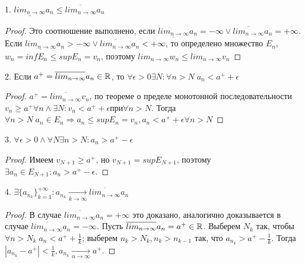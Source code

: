 \documentclass[main]{subfiles}
\begin{document}
\begin{theorem}\label{updown1}
    1. $\underline{lim_{n\to\infty}}a_n \leq \overline{lim_{n\to\infty}}a_n$
\end{theorem}
\begin{proof}
    Это соотношение выполнено, если $\underline{lim_{n\to\infty}}a_n = 
    -\infty \vee \overline{lim_{n\to\infty}}a_n = +\infty$. Если 
    $\underline{lim_{n\to\infty}}a_n > -\infty \vee 
    \overline{lim_{n\to\infty}}a_n < +\infty$, то определено множество 
    $E_n$, $w_n = infE_n \leq supE_n = v_n$,
    поэтому $lim_{n\to\infty}w_n \leq lim_{n\to\infty}v_n$
\end{proof}

\begin{theorem}\label{updown2}
    2. Если $a^+ = \overline{lim_{n\to\infty}}a_n \in \mathbb{R}$, то $\forall \epsilon > 0
    \exists N : \forall n > N \; a_n < a^+ + \epsilon$
\end{theorem}
\begin{proof}
    $a^+ = \overline{lim_{n\to\infty}}v_n$, по теореме о пределе монотонной 
    последовательности $v_n \geq a^+ \forall n \wedge \exists N : v_n <
    a^+ + \epsilon \text{при} \forall n > N$. Тогда $\forall n > N \; a_n \in 
    E_n \Rightarrow a_n \leq supE_n = v_n, a_n < a^+ + \epsilon \forall n > N$
\end{proof}

\begin{theorem}\label{updown3}
    3. $\forall \epsilon > 0 \wedge \forall N \exists n > N : a_n > a^+ - \epsilon$
\end{theorem}
\begin{proof}
    Имеем $v_{N+1} \geq a^+$, но $v_{N+1}=supE_{N+1}$, поэтому $\exists
    a_n \in E_{N+1} : a_n > a^+ - \epsilon$. 
\end{proof}

\begin{theorem}\label{updown4}
    4. $\exists \{a_{n_k}\}_{k=1}^{+\infty} : a_{n_k} \underset{k\to\infty}{\to}
    \overline{lim_{n\to\infty}}a_n$
\end{theorem}
\begin{proof}
    В случае $\overline{lim_{n\to\infty}}a_n = +\infty$ это доказано, аналогично
    доказывается в случае $\overline{lim_{n\to\infty}}a_n = -\infty$. 
    Пусть $\overline{lim_{n\to\infty}}a_n = a^+ \in \mathbb{R}$. Выберем $N_k$ так, чтобы
    $\forall n > N_k \; a_n < a^+ + \frac{1}{k}$; выберем $n_k > N_k, n_k >
    n_{k-1}$ так, что $a_{n_k} > a^+ - \frac{1}{k}$. Тогда 
    $|a_{n_k} - a^+| < \frac{1}{k}, a_{n_k} \underset{n\to\infty}{\to} a^+$.
\end{proof}
\end{document}
